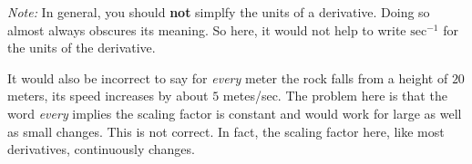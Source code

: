 \documentclass{ximera}
\begin{document}
\begin{example}
\begin{example}
\begin{explanation}
\begin{enumerate}
\emph{Note:} In general, you should {\bf not} simplfy the units of a derivative. Doing so almost always obscures its meaning. So here, it would not help to write $\text{sec}^{-1}$ for the units of the derivative. 

It would also be incorrect to say for \emph{every} meter the rock falls from a height of $20$ meters, its speed increases by about $5$ metes/sec.  The problem here is that the word \emph{every} implies the scaling factor is constant and would work for large as well as small changes. This is not correct. In fact, the scaling factor here, like most derivatives, continuously changes. 

\end{enumerate}
\end{explanation}



\end{example}



\end{example}
\end{document}
